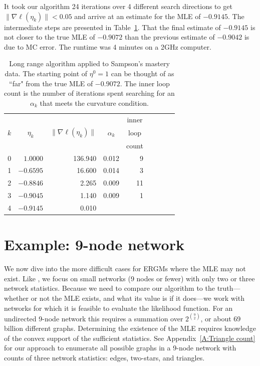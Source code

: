 It took our algorithm 24 iterations over 4 different search directions to get $\lVert 
\nabla \ell( \eta_k ) \rVert < 0.05$ and arrive at an estimate for the MLE of  $-0.9145$.  The intermediate steps are presented in Table~\ref{T:Sampson redo}.  That the final estimate of $-0.9145$ is not closer to the true MLE of $-0.9072$ than the previous estimate of $-0.9042$ is due to MC error.  The runtime was 4 minutes on a 2GHz computer.

\begin{table} \label{T:Sampson redo}
\caption{
Long range algorithm applied to Sampson's 
mastery data.  The starting point of $\eta^0 = 1$ can be thought of as ``far" from the
true MLE of $-0.9072$.  The inner loop count is the number of iterations spent searching for an $\alpha_k$ that meets the curvature condition.  
}
\begin{center}
\begin{tabular}{rrrrrrlrr}
  \hline
    &  &  &  & \multicolumn{1}{c}{inner}\\
  \multicolumn{1}{c}{$k$} & 
  \multicolumn{1}{c}{$\eta_k$} &
  \multicolumn{1}{c}{$\lVert \nabla \ell(\eta_k) \rVert$} &
  \multicolumn{1}{c}{$\alpha_k$} &
  \multicolumn{1}{c}{loop }\\
    &  &  &  & \multicolumn{1}{c}{count}\\
  \hline
   0 &  $1.0000$ & 136.940 &  0.012 & 9 \\
   1 & $-0.6595$ & 16.600  &  0.014 & 3 \\
   2 & $-0.8846$ & 2.265   &  0.009 & 11 \\
   3 & $-0.9045$ & 1.140   &  0.009 & 1 \\
   4 & $-0.9145$ & 0.010   &  & \\
   \hline
\end{tabular}
\end{center}
\end{table}


\section{Example: 9-node network}
We now dive into the more difficult cases for ERGMs where the MLE may not exist.
Like \citet{Handcock:degeneracy, Rinaldo:2009}, we focus on small networks (9 nodes or 
fewer) with only two or three network statistics.  
Because we need to compare our algorithm to the truth---whether or not the MLE exists, 
and what its value
is if it does---we work with networks for which it is feasible to evaluate the likelihood
function.  For an undirected 9-node network this requires a summation over  $2^{{9\choose 2}}$, or about 69 billion different graphs.  Determining the existence of the MLE
requires knowledge of the convex support of the sufficient statistics.  See Appendix~\ref{A:Triangle count} for our approach to enumerate all possible graphs in a 9-node network with counts of three network statistics: edges, two-stars, and triangles.

